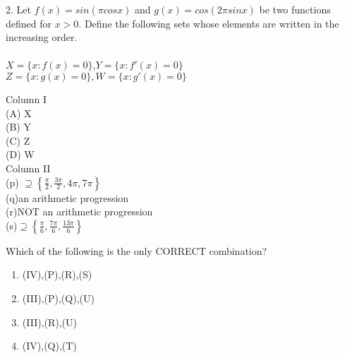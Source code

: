\documentclass[journal,12pt,twocolumn]{IEEEtran}
\theoremstyle{remark}
\begin{document}
2. Let $f(x)=sin(\pi cosx)$ and $g(x)=cos(2\pi sinx)$ be two functions defined for $x>0$. Define the following sets whose elements are written in the increasing order.\hfill{}
\\\\$X=\{x:f(x)=0\}$,$Y=\{x:f'(x)=0\}$\\
$Z=\{x:g(x)=0\}, W=\{x:g'(x)=0\}$
\\
\begin{multicols}{2}
Column I
\\
(A) X
\\
(B) Y
\\
(C) Z
\\
(D) W
\columnbreak
\\
Column II
\\
(p) $\supseteq \left\{ \frac{\pi}{2}, \frac{3\pi}{2}, 4\pi, 7\pi \right\}$
\\
(q)an arithmetic progression
\\
(r)NOT an arithmetic progression
\\
(s)$\supseteq\left\{\frac{\pi}{6},\frac{7\pi}{6},\frac{13\pi}{6}\right\}$


\end{multicols}
Which of the following is the only CORRECT combination?
\\
\begin{enumerate}[label=\alph*]
\item(IV),(P),(R),(S)
\item(III),(P),(Q),(U)
\item(III),(R),(U)
\item(IV),(Q),(T)
\end{enumerate}
\end{document}
